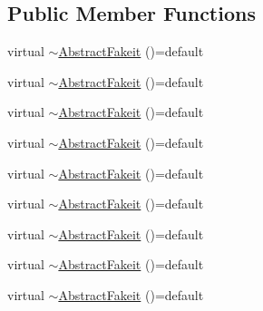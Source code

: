\subsection*{Public Member Functions}
\begin{DoxyCompactItemize}
\item 
virtual \mbox{\hyperlink{classfakeit_1_1AbstractFakeit_aa5ca7471ccad64432fdb54a1bff5b070}{$\sim$\+Abstract\+Fakeit}} ()=default
\item 
virtual \mbox{\hyperlink{classfakeit_1_1AbstractFakeit_aa5ca7471ccad64432fdb54a1bff5b070}{$\sim$\+Abstract\+Fakeit}} ()=default
\item 
virtual \mbox{\hyperlink{classfakeit_1_1AbstractFakeit_aa5ca7471ccad64432fdb54a1bff5b070}{$\sim$\+Abstract\+Fakeit}} ()=default
\item 
virtual \mbox{\hyperlink{classfakeit_1_1AbstractFakeit_aa5ca7471ccad64432fdb54a1bff5b070}{$\sim$\+Abstract\+Fakeit}} ()=default
\item 
virtual \mbox{\hyperlink{classfakeit_1_1AbstractFakeit_aa5ca7471ccad64432fdb54a1bff5b070}{$\sim$\+Abstract\+Fakeit}} ()=default
\item 
virtual \mbox{\hyperlink{classfakeit_1_1AbstractFakeit_aa5ca7471ccad64432fdb54a1bff5b070}{$\sim$\+Abstract\+Fakeit}} ()=default
\item 
virtual \mbox{\hyperlink{classfakeit_1_1AbstractFakeit_aa5ca7471ccad64432fdb54a1bff5b070}{$\sim$\+Abstract\+Fakeit}} ()=default
\item 
virtual \mbox{\hyperlink{classfakeit_1_1AbstractFakeit_aa5ca7471ccad64432fdb54a1bff5b070}{$\sim$\+Abstract\+Fakeit}} ()=default
\item 
virtual \mbox{\hyperlink{classfakeit_1_1AbstractFakeit_aa5ca7471ccad64432fdb54a1bff5b070}{$\sim$\+Abstract\+Fakeit}} ()=default
\end{DoxyCompactItemize}
